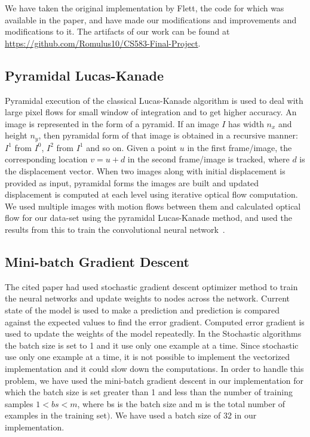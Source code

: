 We have taken the original implementation by Flett, the code for which was available in the paper, and have made our modifications and improvements and modifications to it.
The artifacts of our work can be found at \url{https://github.com/Romulus10/CS583-Final-Project}.

\subsection{Pyramidal Lucas-Kanade}\label{subsec:pyramidal-lucas-kanade}
Pyramidal execution of the classical Lucas-Kanade algorithm is used to deal with large pixel flows for small window of integration and to get higher accuracy.
An image is represented in the form of a pyramid.
If an image $I$ has width $n_x$ and height $n_y$, then pyramidal form of that image is obtained in a recursive manner: $I^1$ from $I^0$, $I^2$ from $I^1$ and so on.
Given a point $u$ in the first frame/image, the corresponding location $v=u+d$ in the second frame/image is tracked, where $d$ is the displacement vector.
When two images along with initial displacement is provided as input, pyramidal forms the images are built and updated displacement is computed at each level using iterative optical flow computation.
We used multiple images with motion flows between them and calculated optical flow for our data-set using the pyramidal Lucas-Kanade method, and used the results from this to train the convolutional neural network~\cite{bouguet}.

\subsection{Mini-batch Gradient Descent}\label{subsec:mini-batch-gradient-descent}
The cited paper had used stochastic gradient descent optimizer method to train the neural networks and update weights to nodes across the network.
Current state of the model is used to make a prediction and prediction is compared against the expected values to find the error gradient.
Computed error gradient is used to update the weights of the model repeatedly.
In the Stochastic algorithms the batch size is set to 1 and it use only one example at a time.
Since stochastic use only one example at a time, it is not possible to implement the vectorized implementation and it could slow down the computations.
In order to handle this problem, we have used the mini-batch gradient descent in our implementation for which the batch size is set greater than 1 and less than the number of training samples $1 < bs < m$, where bs is the batch size and m is the total number of examples in the training set$)$.
We have used a batch size of 32 in our implementation\cite{brownlee}.

